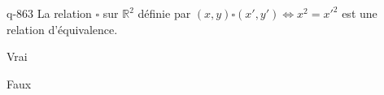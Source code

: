 \begin{truefalse}{q-863}
La relation $\square$ sur $\mathbb R^2$ définie par $(x,y)\square (x',y') \iff x^2=x'^2$ est une relation d'équivalence.
\item* Vrai
\item Faux
\end{truefalse}

